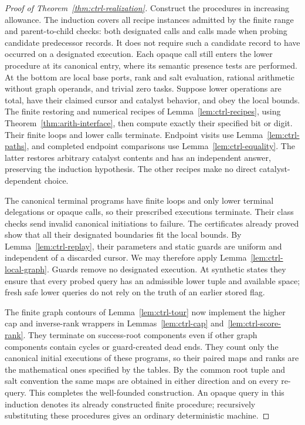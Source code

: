 \begin{proof}[Proof of Theorem~\ref{thm:ctrl-realization}]
Construct the procedures in increasing allowance.  The induction covers
all recipe instances admitted by the finite range and parent-to-child
checks: both designated calls and calls made when probing candidate
predecessor records.  It does not require such a candidate record to
have occurred on a designated execution.  Each opaque call still enters
the lower procedure at its canonical entry, where its semantic presence
tests are performed.  At the bottom are
local base ports, rank and salt evaluation, rational arithmetic without
graph operands, and trivial zero tasks.  Suppose lower operations are
total, have their claimed cursor and catalyst behavior, and obey the
local bounds.  The finite restoring and numerical recipes of
Lemma~\ref{lem:ctrl-recipes}, using
Theorem~\ref{thm:arith-interface}, then compute exactly their specified
bit or digit.  Their finite loops and lower calls terminate.  Endpoint
visits use Lemma~\ref{lem:ctrl-paths}, and completed endpoint comparisons
use Lemma~\ref{lem:ctrl-equality}.  The latter restores arbitrary
catalyst contents and has an independent answer, preserving the
induction hypothesis.  The other recipes make no direct
catalyst-dependent choice.

The canonical terminal programs have finite loops and only lower
terminal delegations or opaque calls, so their prescribed executions
terminate.  Their class checks send invalid canonical initiations to
failure.  The certificates already proved show that all their
designated boundaries fit the local bounds.  By
Lemma~\ref{lem:ctrl-replay}, their parameters and static guards are
uniform and independent of a discarded cursor.  We may therefore
apply Lemma~\ref{lem:ctrl-local-graph}.  Guards remove no designated
execution.  At synthetic states they ensure that every probed query
has an admissible lower tuple and available space; fresh safe lower
queries do not rely on the truth of an earlier stored flag.

The finite graph contours of Lemma~\ref{lem:ctrl-tour} now implement
the higher cap and inverse-rank wrappers in
Lemmas~\ref{lem:ctrl-cap} and~\ref{lem:ctrl-score-rank}.  They terminate
on success-root components even if other graph components contain
cycles or guard-created dead ends.  They count only the canonical
initial executions of these programs, so their paired maps and ranks
are the mathematical ones specified by the tables.  By the common root
tuple and salt convention the same maps are obtained in either
direction and on every re-query.  This completes the well-founded
construction.  An opaque query in this induction denotes its already
constructed finite procedure; recursively substituting these
procedures gives an ordinary deterministic machine.


\end{proof}
